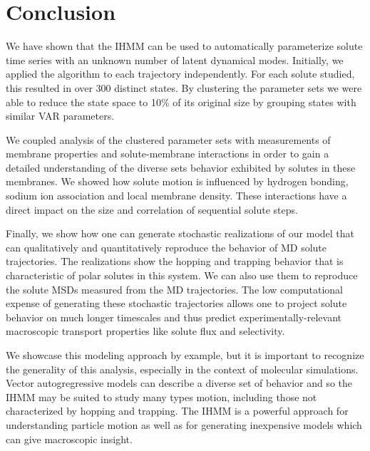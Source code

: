 \documentclass[journal=jpcbfk,manuscript=article]{achemso}
\begin{document}
  
  \section{Conclusion}
  
  We have shown that the IHMM can be used to automatically parameterize solute 
  time series with an unknown number of latent dynamical modes. Initially, we applied
  the algorithm to each trajectory independently. For each solute studied, this resulted
  in over 300 distinct states. By clustering the parameter sets we were able to reduce 
  the state space to 10\% of its original size by grouping states with similar VAR
  parameters.
  
  We coupled analysis of the clustered parameter sets with measurements of membrane 
  properties and solute-membrane interactions in order to gain a detailed understanding
  of the diverse sets behavior exhibited by solutes in these membranes. We showed how
  solute motion is influenced by hydrogen bonding, sodium ion association and local
  membrane density. These interactions have a direct impact on the size and
  correlation of sequential solute steps.
  
  Finally, we show how one can generate stochastic realizations of our model that
  can qualitatively and quantitatively reproduce the behavior of MD solute 
  trajectories. The realizations show the hopping and trapping behavior that is
  characteristic of polar solutes in this system. We can also use them to reproduce
  the solute MSDs measured from the MD trajectories. The low computational expense 
  of generating these stochastic trajectories allows one to project solute behavior
  on much longer timescales and thus predict experimentally-relevant macroscopic 
  transport properties like solute flux and selectivity.
  
  We showcase this modeling approach by example, but it is important to
  recognize the generality of this analysis, especially in the context of molecular
  simulations. Vector autogregressive models can describe a diverse set of behavior
  and so the IHMM may be suited to study many types motion, including those not 
  characterized by hopping and trapping. The IHMM is a powerful approach for 
  understanding particle motion as well as for generating inexpensive models
  which can give macroscopic insight.
  
\end{document}
